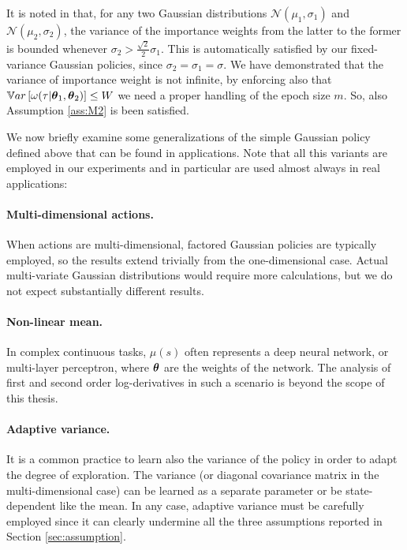 It is noted in \cite{cortes2010learning} that, for any two Gaussian distributions $\mathcal{N}(\mu_1,\sigma_1)$ and $\mathcal{N}(\mu_2,\sigma_2)$, the variance of the importance weights from the latter to the former is bounded whenever $\sigma_2 > \frac{\sqrt{2}}{2}\sigma_1$. This is automatically satisfied by our fixed-variance Gaussian policies, since $\sigma_2=\sigma_1=\sigma$.
We have demonstrated that the variance of importance weight is not infinite, by enforcing also that
$\mathbb{V}ar\left[\omega(\tau| \boldsymbol{\theta}_1, \boldsymbol{\theta}_2)\right] \leq W$ we need a proper handling of the epoch size $m$.
So, also Assumption \ref{ass:M2} is been satisfied.


We now briefly examine some generalizations of the simple Gaussian policy defined above that can be found in applications. Note that all this variants are employed in our experiments and in particular are used almost always in real applications:

\paragraph{Multi-dimensional actions.}
When actions are \newline multi-dimensional, factored Gaussian policies are typically employed, so the results extend trivially from the one-dimensional case. Actual multi-variate Gaussian distributions would require more calculations, but we do not expect substantially different results.

\paragraph{Non-linear mean.}
In complex continuous tasks, $\mu(s)$ often represents a deep neural network, or multi-layer perceptron, where $\boldsymbol{\theta}$ are the weights of the network. The analysis of first and second order log-derivatives in such a scenario is beyond the scope of this thesis.

\paragraph{Adaptive variance.}
It is a common practice to learn also the variance of the policy in order to adapt the degree of exploration. The variance (or diagonal covariance matrix in the multi-dimensional case) can be learned as a separate parameter or be state-dependent like the mean. In any case, adaptive variance must be carefully employed since it can clearly undermine all the three assumptions reported in Section  \ref{sec:assumption}.

